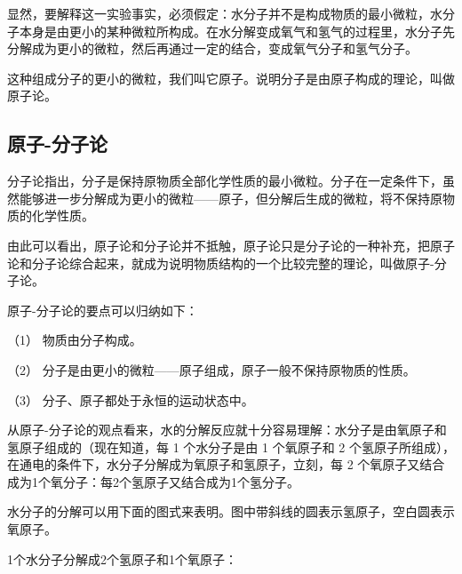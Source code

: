 显然，要解释这一实验事实，必须假定：水分子并不是构成物质的最小微粒，水分子本身是由更小的某种微粒所构成。在水分解变成氧气和氢气的过程里，水分子先分解成为更小的微粒，然后再通过一定的结合，变成氧气分子和氢气分子。

这种组成分子的更小的微粒，我们叫它原子。说明分子是由原子构成的理论，叫做原子论。

\subsection{原子-分子论}

分子论指出，分子是保持原物质全部化学性质的最小微粒。分子在一定条件下，虽然能够进一步分解成为更小的微粒------原子，但分解后生成的微粒，将不保持原物质的化学性质。

由此可以看出，原子论和分子论并不抵触，原子论只是分子论的一种补充，把原子论和分子论综合起来，就成为说明物质结构的一个比较完整的理论，叫做原子-分子论。

原子-分子论的要点可以归纳如下：

（1） 物质由分子构成。

（2） 分子是由更小的微粒------原子组成，原子一般不保持原物质的性质。

（3） 分子、原子都处于永恒的运动状态中。

从原子-分子论的观点看来，水的分解反应就十分容易理解：水分子是由氧原子和氢原子组成的（现在知道，每
1 个水分子是由 1 个氧原子和 2
个氢原子所组成），在通电的条件下，水分子分解成为氧原子和氢原子，立刻，每
2 个氧原子又结合成为1个氧分子：每2个氢原子又结合成为1个氢分子。

水分子的分解可以用下面的图式来表明。图中带斜线的圆表示氢原子，空白圆表示氧原子。

1个水分子分解成2个氢原子和1个氧原子：

